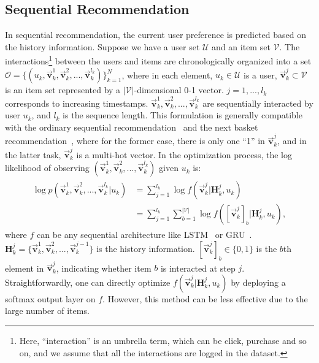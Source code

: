 \documentclass[conference]{IEEEtran}
\theoremstyle{definition}
\theoremstyle{theorem}
\theoremstyle{proof}
\theoremstyle{remark}
\begin{document}
\subsection{Sequential Recommendation}
In sequential recommendation, the current user preference is predicted based on the history information.
Suppose we have a user set $\mathcal{U}$ and an item set $\mathcal{V}$.
The interactions\footnote{Here, ``interaction'' is an umbrella term, which can be click, purchase and so on, {and we assume that all the interactions are logged in the dataset.}} between the users and items are chronologically organized into a set $\mathcal{O}=\{(u_k,\vec{\bm{v}}_k^1,\vec{\bm{v}}_k^2,...,\vec{\bm{v}}_k^{l_k})\}_{k=1}^N$, where in each element, $u_k\in \mathcal{U}$ is a user,  $\vec{\bm{v}}_k^{j}\subset \mathcal{V}$ is an item set represented by a $|\mathcal{V}|$-dimensional 0-1 vector.
{$j=1,...,l_k$ corresponds to increasing timestamps.}
$\vec{\bm{v}}_k^1,\vec{\bm{v}}_k^2,...,\vec{\bm{v}}_k^{l_k}$ are sequentially interacted by user $u_k$, and $l_k$ is the sequence length.
This formulation is generally compatible with the ordinary sequential recommendation~\cite{li2017neural} and the next basket recommendation~\cite{rendle2010factorizing}, where for the former case, there is only one ``1'' in $\vec{\bm{v}}_k^{j}$, and in the latter task, $\vec{\bm{v}}_k^{j}$ is a multi-hot vector.
In the optimization process, the log likelihood of observing $(\vec{\bm{v}}_k^1,\vec{\bm{v}}_k^2,...,\vec{\bm{v}}_k^{l_k})$ given $u_k$ is:
	\begin{eqnarray}\label{or-loss}
		\begin{aligned}
			\log{p(\vec{\bm{v}}_k^1,\vec{\bm{v}}_k^2,...,\vec{\bm{v}}_k^{l_k}|u_k)} &= \sum_{j=1}^{l_k} {\log{f(\vec{\bm{v}}_{k}^{j}|\bm{H}_{k}^j, {u_k})}}\\
			&= \sum_{j=1}^{l_k}\sum_{b=1}^{|\mathcal{V}|}{\log{f([\vec{\bm{v}}_{k}^{j}]_b|\bm{H}_{k}^j, {u_k})}},
		\end{aligned}
	\end{eqnarray}
where 
$f$ can be any sequential architecture like LSTM~\cite{li2017neural} or GRU~\cite{hidasi2015session}.
$\bm{H}_{k}^j = \{\vec{\bm{v}}_k^1,\vec{\bm{v}}_k^2,...,\vec{\bm{v}}_k^{j-1}\}$ is the history information.
$[\vec{\bm{v}}_{k}^{j}]_b\in \{0,1\}$ is the $b$th element in $\vec{\bm{v}}_{k}^{j}$, indicating whether item $b$ is interacted at step $j$.
Straightforwardly, one can directly optimize $f(\vec{\bm{v}}_{k}^{j}|\bm{H}_{k}^j, {u_k})$ by deploying a {softmax} output layer on $f$.
However, this method can be less effective due to the large number of items.
\end{document}
